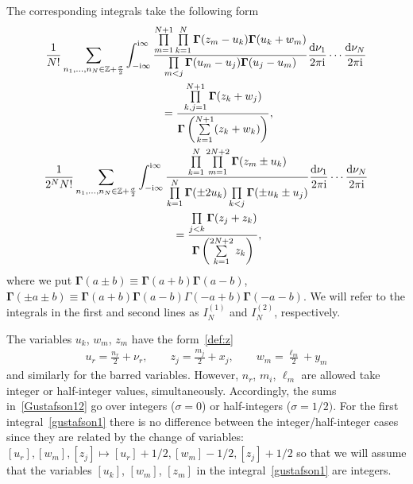 \documentclass[pdftex]{sigma}
\numberwithin{equation}{section}
\begin{document}
The corresponding integrals take the following form~\cite{Derkachov:2016ucn,Derkachov:2017pvx}
\begin{subequations}\label{Gustafson12}
\begin{gather}
\frac1{N!} \sum_{n_1,\dots,n_N\in\mathbb{Z}+\frac{\sigma}{2}}
\int_{-{\rm i}\infty}^{{\rm i}\infty}
\frac{\prod\limits_{m=1}^{N+1}\prod\limits_{k=1}^{N}
\boldsymbol{\Gamma}(z_m-u_k)\boldsymbol{\Gamma}(u_k+w_m)}{ \prod\limits_{m<j}
\boldsymbol{\Gamma}(u_m- u_j)\boldsymbol{\Gamma}(u_j- u_m)}
\frac{{\rm d}\nu_1}{2\pi {\rm i}}\cdots\frac{{\rm d}\nu_N}{2\pi {\rm i}}\nonumber\\
\qquad{} =\frac{\prod\limits_{k,j=1}^{N+1}\boldsymbol{\Gamma}(z_k+ w_j)}{
\boldsymbol{\Gamma}\left(\sum\limits_{k=1}^{N+1} (z_k+w_k) \right)},\label{gustafson1}\\
\frac1{2^{N}N!}\sum_{n_1,\dots,n_N\in\mathbb{Z}+\frac{\sigma}{2}}
\int_{-{\rm i}\infty}^{{\rm i}\infty}
\frac{ \prod\limits_{k=1}^{N} \prod\limits_{m=1}^{2N+2}
 \boldsymbol{\Gamma}(z_m\pm u_k)}
{\prod\limits_{k=1}^{N}{\boldsymbol{\Gamma}}(\pm 2u_k) \prod\limits_{ k<j} {\boldsymbol{\Gamma}} (\pm u_k\pm u_j)
}\frac{{\rm d}\nu_1}{2\pi {\rm i}}\cdots\frac{{\rm d}\nu_N}{2\pi {\rm i}}\nonumber\\
\qquad{} = \frac{\prod\limits_{j<k}{\boldsymbol{\Gamma}}(z_j + z_k)}{{\boldsymbol{\Gamma}}\left(\sum\limits_{k=1}^{2N+2} z_k\right)}, \label{gustafson2}
\end{gather}
\end{subequations}
where we put $\boldsymbol \Gamma(a\pm b)\equiv \boldsymbol \Gamma(a+b) \boldsymbol \Gamma(a-b)$, $\boldsymbol
\Gamma(\pm a\pm b)\equiv \boldsymbol \Gamma(a+b) \boldsymbol \Gamma(a-b)\Gamma(-a+b) \boldsymbol \Gamma(-a-b)$. We will
refer to the integrals in the first and second lines as $I_N^{(1)}$ and $I_N^{(2)}$, respectively.

The variables $u_k$, $w_m$, $z_m$ have the form~\eqref{def:z}
\begin{gather*}
u_r=\frac{n_r}2+ \nu_r, \qquad z_j=\frac{m_j}2+ x_j, \qquad w_m=\frac{\ell_m}2+ y_m
\end{gather*}
and similarly for the barred variables. However, $n_r$, $m_i$, $\ell_m$ are allowed take integer or half-integer values,
simultaneously. Accordingly, the sums in~\eqref{Gustafson12} go over integers ($\sigma=0$) or half-integers
($\sigma=1/2)$. For the first integral~\eqref{gustafson1} there is no difference between the integer/half-integer cases
since they are related by the change of variables: $[u_r], [w_m], [z_j] \mapsto [u_r]+1/2, [w_m]-1/2,[z_j]+1/2$ so that we will assume that the variables $[u_k]$, $[w_m]$, $[z_m]$ in the integral~\eqref{gustafson1} are integers.
\end{document}
